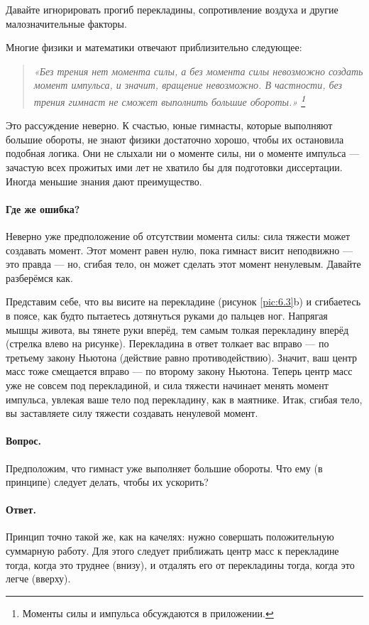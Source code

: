 Давайте игнорировать прогиб перекладины, сопротивление воздуха и другие малозначительные факторы.

Многие физики и математики отвечают приблизительно следующее:
\begin{quote}
\emph{«Без трения нет момента силы, а без момента силы невозможно создать момент импульса,
и значит, вращение невозможно.
В частности, без трения гимнаст не сможет выполнить большие обороты.»
\footnote{Моменты силы и импульса обсуждаются в приложении.}}
\end{quote}

Это рассуждение неверно.
К счастью, юные гимнасты, которые выполняют большие обороты, не знают физики достаточно хорошо, чтобы их остановила подобная логика.
Они не слыхали ни о моменте силы, ни о моменте импульса ---
зачастую всех прожитых ими лет не хватило бы для подготовки диссертации.
Иногда меньшие знания дают преимущество.

\paragraph{Где же ошибка?}
Неверно уже предположение об отсутствии момента силы: сила тяжести может создавать момент.
Этот момент равен нулю, пока гимнаст висит неподвижно --- это правда --- но, сгибая тело, он может сделать этот момент ненулевым.
Давайте разберёмся как.

Представим себе, что вы висите на перекладине (рисунок \ref{pic:6.3}b) и сгибаетесь в поясе, как будто пытаетесь дотянуться руками до пальцев ног.
Напрягая мышцы живота, вы тянете руки вперёд, тем самым толкая перекладину вперёд (стрелка влево на рисунке).
Перекладина в ответ толкает вас вправо — по третьему закону Ньютона (действие равно противодействию).
Значит, ваш центр масс тоже смещается вправо — по второму закону Ньютона.
Теперь центр масс уже не совсем под перекладиной, и сила тяжести начинает менять момент импульса, увлекая ваше тело под перекладину, как в маятнике.
Итак, сгибая тело, вы заставляете силу тяжести создавать ненулевой момент.

\paragraph{Вопрос.}
Предположим, что гимнаст уже выполняет большие обороты.
Что ему (в принципе) следует делать, чтобы их ускорить?

\paragraph{Ответ.}
Принцип точно такой же, как на качелях: нужно совершать положительную суммарную работу.
Для этого следует приближать центр масс к перекладине тогда, когда это труднее (внизу), и отдалять его от перекладины тогда, когда это легче (вверху).


